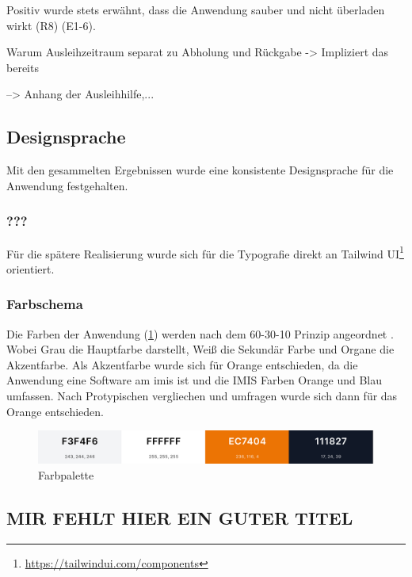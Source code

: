 Positiv wurde stets erwähnt, dass die Anwendung sauber und nicht überladen wirkt (R8) (E1-6).


Warum Ausleihzeitraum separat zu Abholung und Rückgabe -> Impliziert das bereits

--> Anhang der Ausleihhilfe,...
\subsection{Designsprache}
Mit den gesammelten Ergebnissen wurde eine konsistente Designsprache für die Anwendung festgehalten.

\subsubsection{???}

Für die spätere Realisierung wurde sich für die Typografie direkt an Tailwind
UI\footnote{\url{https://tailwindui.com/components}} orientiert.

\subsubsection{Farbschema}

Die Farben der Anwendung (\ref{fig:farben}) werden nach dem 60-30-10 Prinzip angeordnet \cite{experience_using}. Wobei Grau
die Hauptfarbe darstellt, Weiß die Sekundär Farbe und Organe die Akzentfarbe. Als Akzentfarbe wurde
sich für Orange entschieden, da die Anwendung eine Software am \ac{imis} ist und die IMIS Farben
Orange und Blau umfassen. Nach Protypischen vergliechen und umfragen wurde sich dann für das Orange
entschieden.
\begin{figure}[h]
    \centering
    \includegraphics[scale=0.23]{Bilder/farben.png}
    \caption[Farbpalette]{Farbpalette}
    \label{fig:farben}
\end{figure}

\subsection{MIR FEHLT HIER EIN GUTER TITEL}

